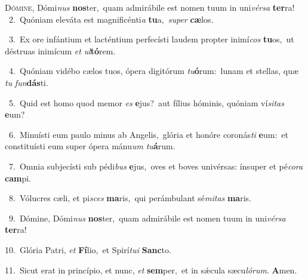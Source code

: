 \lettrine{\initial\textcolor{\initialcolor}{D}}{ómine,} Dómi\textit{nus} \textbf{nos}\-ter,~\star quam admirábile est nomen tuum in uni\-\textit{vér}\-\textit{sa} \textbf{ter}\-ra!\\
{\numbfont\textcolor{\numbcolor}{~2.}}~Quóniam eleváta est magnificénti\textit{a} \textbf{tu}\-a,~\star \textit{su}\-\textit{per} \textbf{cæ}\-los.\par
{\numbfont\textcolor{\numbcolor}{~3.}}~Ex ore infántium et lacténtium perfecísti laudem propter inimí\textit{cos} \textbf{tu}\-os,~\star ut déstruas inimícum \textit{et} \textit{ul}\-\textbf{tó}rem.\par
{\numbfont\textcolor{\numbcolor}{~4.}}~Quóniam vidébo cælos tuos, ópera digitórum \textit{tu}\-\textbf{ó}rum:~\star lunam et stellas, quæ \textit{tu} \textit{fun}\-\textbf{dás}ti.\par
{\numbfont\textcolor{\numbcolor}{~5.}}~Quid est homo quod memor \textit{es} \textbf{e}\-jus?~\star aut fílius hóminis, quóniam ví\-\textit{si}\-\textit{tas} \textbf{e}\-um?\par
{\numbfont\textcolor{\numbcolor}{~6.}}~Minuísti eum paulo minus ab Angelis,~\dagger glória et honóre coronás\textit{ti} \textbf{e}\-um:~\star et constituísti eum super ópera mánu\textit{um} \textit{tu}\-\textbf{á}rum.\par
{\numbfont\textcolor{\numbcolor}{~7.}}~Omnia subjecísti sub pédi\textit{bus} \textbf{e}\-jus,~\star oves et boves univérsas: ínsuper et pé\-\textit{co}\-\textit{ra} \textbf{cam}\-pi.\par
{\numbfont\textcolor{\numbcolor}{~8.}}~Vólucres cæli, et pi\textit{sces} \textbf{ma}\-ris,~\star qui perámbulant sé\-\textit{mi}\-\textit{tas} \textbf{ma}\-ris.\par
{\numbfont\textcolor{\numbcolor}{~9.}}~Dómine, Dómi\textit{nus} \textbf{nos}\-ter,~\star quam admirábile est nomen tuum in uni\-\textit{vér}\-\textit{sa} \textbf{ter}\-ra!\par
{\numbfont\textcolor{\numbcolor}{10.}}~Glória Patri, \textit{et} \textbf{Fí}\-lio,~\star et Spirí\-\textit{tu}\-\textit{i} \textbf{Sanc}\-to.\par
{\numbfont\textcolor{\numbcolor}{11.}}~Sicut erat in princípio, et nunc, \textit{et} \textbf{sem}\-per,~\star et in sǽcula sæcu\-\textit{ló}\-\textit{rum}. \textbf{A}\-men.\par
